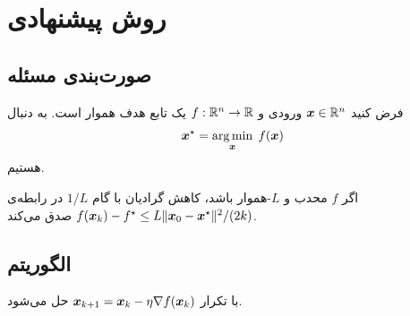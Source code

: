 \section{روش پیشنهادی}
\subsection{صورت‌بندی مسئله}
فرض کنید $\bm{x}\in\mathbb{R}^{n}$ ورودی و $f:\mathbb{R}^{n}\to\mathbb{R}$ یک تابع هدف هموار است. به دنبال
\begin{equation}\label{eq:opt}
  \bm{x}^{\star}=\operatorname*{arg\,min}_{\bm{x}}\; f(\bm{x})
\end{equation}
هستیم.

\begin{theorem}\label{thm:conv}
اگر $f$ محدب و $L$-هموار باشد، کاهش گرادیان با گام $1/L$ در رابطه‌ی
$f(\bm{x}_k)-f^{\star}\le L\lVert\bm{x}_0-\bm{x}^{\star}\rVert^{2}/(2k)$ صدق می‌کند.
\end{theorem}

\subsection{الگوریتم}
 با تکرار $\bm{x}_{k+1}=\bm{x}_k-\eta\nabla f(\bm{x}_k)$ حل می‌شود.
